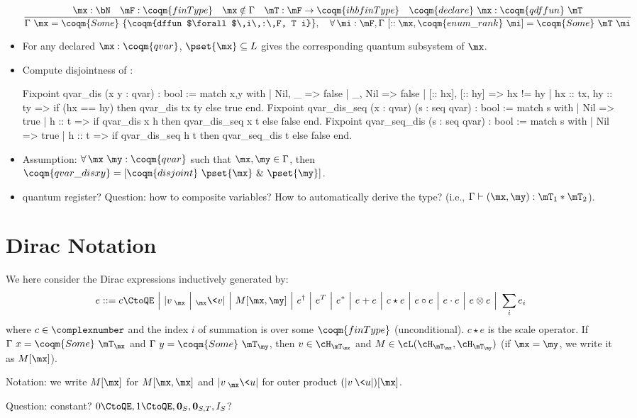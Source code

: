 \begin{itemize}
    $$\frac{\mx : \bN\quad\mF:\coqm{finType}\quad \mx\notin\Gamma\quad\mT:\mF\rightarrow\coqm{ihbfinType}\quad\coqm{declare}\ \mx : \coqm{qdffun}\ \mT}{\Gamma\ \mx = \coqm{Some}\ \{\coqm{dffun $\forall$\,i\,:\,F, T i}\},\quad \forall\,\mi:\mF, \Gamma\ [::\mx,\coqm{enum\_rank}\ \mi] = \coqm{Some}\ \mT\ \mi}$$
    \item For any declared $\mx : \coqm{qvar}$, $\pset{\mx}\subseteq L$ gives the corresponding quantum subsystem of $\mx$.
    \item Compute disjointness of :
    \begin{coq}
    Fixpoint qvar_dis (x y : qvar) : bool :=
        match x,y with
        | Nil, _ => false
        | _, Nil => false
        | [:: hx], [:: hy] => hx != hy
        | hx :: tx, hy :: ty => if (hx == hy) then qvar_dis tx ty
                                else true
        end.
    Fixpoint qvar_dis_seq (x : qvar) (s : seq qvar) : bool :=
        match s with
        | Nil => true
        | h :: t => if qvar_dis x h then qvar_dis_seq x t else false
        end.
    Fixpoint qvar_seq_dis (s : seq qvar) : bool :=
        match s with
        | Nil => true
        | h :: t => if qvar_dis_seq h t then qvar_seq_dis t else false
        end.
    \end{coq}
    \item Assumption: $\forall\,\mx\ \my:\coqm{qvar}$ such that $\mx,\my\in\Gamma$, then $\coqm{qvar\_dis x y} = [\coqm{disjoint}\ \pset{\mx}\ \&\ \pset{\my}]$.
    \item quantum register? Question: how to composite variables? How to automatically derive the type? (i.e., $\Gamma\vdash (\mx,\my) : \mT_1\ast\mT_2 $).
\end{itemize}

\section{Dirac Notation}

\begin{definition}[syntax]
    We here consider the Dirac expressions inductively generated by:
    $$e ::= c\CtoQE\ \Big|\ |v\>_\mx\ \Big|\ {}_\mx\<v|\ 
    \Big|\ M[\mx,\my]\ \Big|\ e^\dag\ \Big|\ e^T\ \Big|\ e^\ast\ \Big|\ e + e\
    \Big|\ c \star e \ \Big|\ e \circ e\ \Big|\ e \cdot e\ \Big|\ e\otimes e\ \Big|\ \sum_i e_i$$
    where $c\in\complexnumber $ and the index $i$ of summation is over some $\coqm{finType}$ (unconditional). $c \star e$ is the scale operator.
    If $\Gamma\ x = \coqm{Some}\ \mT_\mx$ and $\Gamma\ y = \coqm{Some}\ \mT_\my$, then $v\in\cH_{\mT_\mx}$ and $M\in\cL(\cH_{\mT_\mx},\cH_{\mT_\my})$ (if $\mx = \my$, we write it as $M[\mx]$). 
    
    Notation: we write $M[\mx]$ for $M[\mx,\mx]$ and  $|v\>_\mx\<u|$
    for outer product $(|v\>\<u|)[\mx]$.
    
    Question: constant? $0\CtoQE, 1\CtoQE, {\bf 0}_S, {\bf 0}_{S,T}, I_S$?
\end{definition} 

